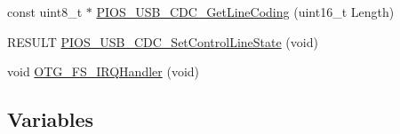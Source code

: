 \begin{DoxyCompactItemize}
\item 
const uint8\-\_\-t $\ast$ \hyperlink{group___p_i_o_s___u_s_b_h_o_o_k_gaa001d7fe6ba14dccc0b0cf8fe21d5548}{\-P\-I\-O\-S\-\_\-\-U\-S\-B\-\_\-\-C\-D\-C\-\_\-\-Get\-Line\-Coding} (uint16\-\_\-t \-Length)
\item 
\-R\-E\-S\-U\-L\-T \hyperlink{group___p_i_o_s___u_s_b_h_o_o_k_gacbf6b3b4149e51a74c2f4255f0f8a199}{\-P\-I\-O\-S\-\_\-\-U\-S\-B\-\_\-\-C\-D\-C\-\_\-\-Set\-Control\-Line\-State} (void)
\item 
void \hyperlink{group___p_i_o_s___u_s_b_h_o_o_k_ga75135d7a041e2932e9903e8a345b3fc4}{\-O\-T\-G\-\_\-\-F\-S\-\_\-\-I\-R\-Q\-Handler} (void)
\end{DoxyCompactItemize}
\subsection*{\-Variables}
